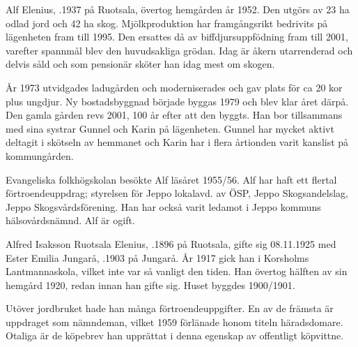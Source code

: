 %
Alf Elenius, .1937 på Ruotsala, övertog hemgården år 1952. Den utgörs av 23 ha odlad jord och 42 ha skog. Mjölkproduktion har framgångsrikt bedrivits på lägenheten fram till 1995. Den ersattes då av biffdjursuppfödning fram till 2001, varefter spannmål blev den huvudsakliga grödan. Idag är åkern utarrenderad och delvis såld och som pensionär  sköter han idag mest om skogen.

År 1973 utvidgades ladugården och moderniserades och gav plats för ca 20 kor plus ungdjur. Ny bostadsbyggnad började byggas 1979 och blev klar året därpå. Den gamla gården revs 2001, 100 år efter att den byggts. Han bor tillsammans med sina systrar Gunnel och Karin på lägenheten. Gunnel har mycket aktivt deltagit i skötseln av hemmanet och Karin har i flera årtionden varit kanslist på kommungården.

Evangeliska folkhögskolan besökte Alf läsåret 1955/56. Alf har haft ett flertal förtroendeuppdrag; styrelsen för Jeppo lokalavd. av ÖSP, Jeppo Skogsandelslag, Jeppo Skogsvårdsförening. Han har också varit ledamot i Jeppo kommuns hälsovårdsnämnd. Alf är ogift.



%



%
Alfred Isaksson Ruotsala Elenius, .1896 på Ruotsala, gifte sig 08.11.1925 med Ester Emilia Jungarå, .1903 på Jungarå. År 1917 gick han i Korsholms Lantmannaskola, vilket inte var så vanligt den tiden. Han övertog hälften av sin hemgård 1920, redan innan han gifte sig. Huset byggdes 1900/1901.

Utöver jordbruket hade han många förtroendeuppgifter. En av de främsta är uppdraget som nämndeman, vilket 1959 förlänade honom titeln häradsdomare. Otaliga är de köpebrev han upprättat i denna egenskap av offentligt köpvittne.

